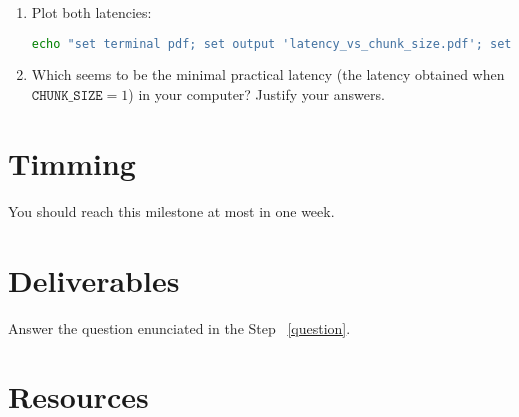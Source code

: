 \begin{enumerate}
\item Plot both latencies:

  \begin{lstlisting}[language=Bash]
    echo "set terminal pdf; set output 'latency_vs_chunk_size.pdf'; set xlabel 'CHUNK\_SIZE (frames)'; set ylabel 'Latency (seconds)'; set key left; plot 'latency_vs_chunk_size.txt' using 1:2 title 'Real' with linespoints, 'latency_vs_chunk_size.txt' using 1:3 title 'Minimal' with linespoints" | gnuplot
  \end{lstlisting}
  
\item Which seems to be the minimal practical latency (the latency obtained
  when $\mathtt{CHUNK\_SIZE}=1$) in your computer? Justify your
  answers. \label{question}

\end{enumerate}

\section{Timming}

You should reach this milestone at most in one week.

\section{Deliverables}

Answer the question enunciated in the Step ~\ref{question}.

\section{Resources}


